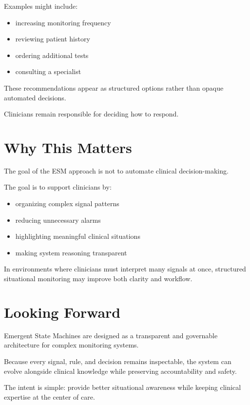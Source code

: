 \documentclass[11pt]{article}
\begin{document}
Examples might include:

\begin{itemize}
\item increasing monitoring frequency
\item reviewing patient history
\item ordering additional tests
\item consulting a specialist
\end{itemize}

These recommendations appear as structured options rather than opaque automated decisions.

Clinicians remain responsible for deciding how to respond.

\section{Why This Matters}

The goal of the ESM approach is not to automate clinical decision-making.

The goal is to support clinicians by:

\begin{itemize}
\item organizing complex signal patterns
\item reducing unnecessary alarms
\item highlighting meaningful clinical situations
\item making system reasoning transparent
\end{itemize}

In environments where clinicians must interpret many signals at once, structured situational monitoring may improve both clarity and workflow.

\section{Looking Forward}

Emergent State Machines are designed as a transparent and governable architecture for complex monitoring systems.

Because every signal, rule, and decision remains inspectable, the system can evolve alongside clinical knowledge while preserving accountability and safety.

The intent is simple: provide better situational awareness while keeping clinical expertise at the center of care.
\end{document}
